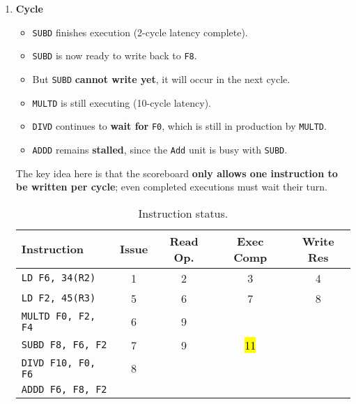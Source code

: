 \begin{enumerate}
    \newpage


    \item \textbf{Cycle \theenumi}
    \begin{itemize}
        \item[\textcolor{Green3}{\faIcon{check}}] \texttt{SUBD} finishes execution (2-cycle latency complete).
        \item[\textcolor{Green3}{\faIcon{check}}] \texttt{SUBD} is now ready to write back to \texttt{F8}.
        \item[\textcolor{Red2}{\faIcon{times}}] But \texttt{SUBD} \textbf{cannot write yet}, it will occur in the next cycle.
        \item \texttt{MULTD} is still executing (10-cycle latency).
        \item \texttt{DIVD} continues to \textbf{wait for} \texttt{F0}, which is still in production by \texttt{MULTD}.
        \item \texttt{ADDD} remains \textbf{stalled}, since the \texttt{Add} unit is busy with \texttt{SUBD}.
    \end{itemize}
    The key idea here is that the scoreboard \textbf{only allows one instruction to be written per cycle}; even completed executions must wait their turn.

    \begin{table}[!htp]
        \centering
        \begin{tabular}{@{} l | c c c c @{}}
            \toprule
            Instruction                 & Issue & Read Op.  & Exec Comp & Write Res \\
            \midrule
            \texttt{LD    F6, 34(R2)}   & 1     & 2         & 3         & 4         \\ [.3em]
            \texttt{LD    F2, 45(R3)}   & 5     & 6         & 7         & 8         \\ [.3em]
            \texttt{MULTD F0, F2, F4}   & 6     & 9         &           &           \\ [.3em]
            \texttt{SUBD  F8, F6, F2}   & 7     & 9         & \hl{11}   &           \\ [.3em]
            \texttt{DIVD  F10, F0, F6}  & 8     &           &           &           \\ [.3em]
            \texttt{ADDD  F6, F8, F2}   &       &           &           &           \\
            \bottomrule
        \end{tabular}
        \caption*{Instruction status.}
    \end{table}


\end{enumerate}
